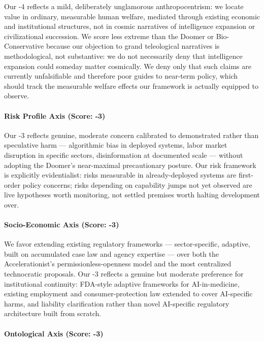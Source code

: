Our -4 reflects a mild, deliberately unglamorous anthropocentrism: we
locate value in ordinary, measurable human welfare, mediated through
existing economic and institutional structures, not in cosmic narratives
of intelligence expansion or civilizational succession. We score less
extreme than the Doomer or Bio-Conservative because our objection to
grand teleological narratives is methodological, not substantive: we do
not necessarily deny that intelligence expansion could someday matter
cosmically. We deny only that such claims are currently unfalsifiable
and therefore poor guides to near-term policy, which should track the
measurable welfare effects our framework is actually equipped to
observe.

\paragraph{Risk Profile Axis (Score:
-3)}\label{risk-profile-axis-score--3-1}

Our -3 reflects genuine, moderate concern calibrated to demonstrated
rather than speculative harm --- algorithmic bias in deployed systems,
labor market disruption in specific sectors, disinformation at
documented scale --- without adopting the Doomer's near-maximal
precautionary posture. Our risk framework is explicitly evidentialist:
risks measurable in already-deployed systems are first-order policy
concerns; risks depending on capability jumps not yet observed are live
hypotheses worth monitoring, not settled premises worth halting
development over.

\paragraph{Socio-Economic Axis (Score:
-3)}\label{socio-economic-axis-score--3-2}

We favor extending existing regulatory frameworks --- sector-specific,
adaptive, built on accumulated case law and agency expertise --- over
both the Accelerationist's permissionless-openness model and the most
centralized technocratic proposals. Our -3 reflects a genuine but
moderate preference for institutional continuity: FDA-style adaptive
frameworks for AI-in-medicine, existing employment and
consumer-protection law extended to cover AI-specific harms, and
liability clarification rather than novel AI-specific regulatory
architecture built from scratch.

\paragraph{Ontological Axis (Score:
-3)}\label{ontological-axis-score--3-1}


